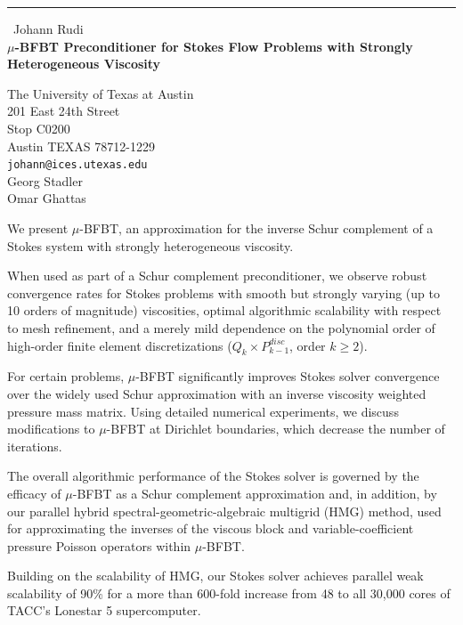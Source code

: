 \documentclass{report}
\begin{document}
\begin{center}
\rule{6in}{1pt} \
{\large Johann Rudi \\
{\bf $\mu$-BFBT Preconditioner for Stokes Flow Problems with Strongly Heterogeneous Viscosity}}

The University of Texas at Austin \\ 201 East 24th Street \\ Stop C0200 \\ Austin TEXAS 78712-1229
\\
{\tt johann@ices.utexas.edu}\\
Georg Stadler\\
Omar Ghattas\end{center}

We present $\mu$-BFBT, an approximation for the inverse Schur complement of a
Stokes system with strongly heterogeneous viscosity.

When used as part of a Schur complement preconditioner, we observe robust
convergence rates for Stokes problems with smooth but strongly varying (up to
10 orders of magnitude) viscosities, optimal algorithmic scalability with
respect to mesh refinement, and a merely mild dependence on the polynomial
order of high-order finite element discretizations
($Q_{k} \times P_{k-1}^{disc}$, order $k\ge2$).

For certain problems, $\mu$-BFBT significantly improves Stokes solver
convergence over the widely used Schur approximation with an inverse viscosity
weighted pressure mass matrix. Using detailed numerical experiments, we
discuss modifications to $\mu$-BFBT at Dirichlet boundaries, which decrease the
number of iterations.

The overall algorithmic performance of the Stokes solver is governed by the
efficacy of $\mu$-BFBT as a Schur complement approximation and, in addition, by
our parallel hybrid spectral-geometric-algebraic multigrid (HMG) method, used
for approximating the inverses of the viscous block and variable-coefficient
pressure Poisson operators within $\mu$-BFBT.

Building on the scalability of HMG, our Stokes solver achieves parallel weak
scalability of 90\% for a more than 600-fold increase from 48 to all 30,000
cores of TACC's Lonestar 5 supercomputer.
\end{document}
